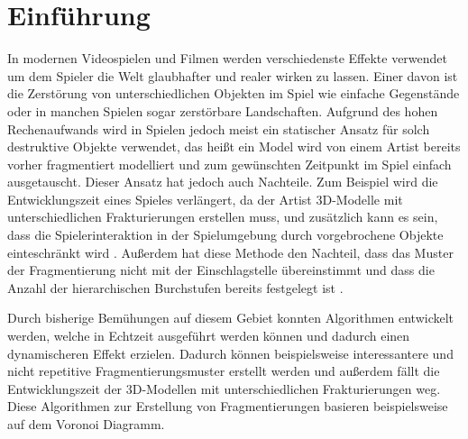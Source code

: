 \chapter{Einführung}

In modernen Videospielen und Filmen werden verschiedenste Effekte verwendet um dem Spieler die Welt glaubhafter und realer wirken zu lassen.
Einer davon ist die Zerstörung von unterschiedlichen Objekten im Spiel wie einfache Gegenstände oder in manchen Spielen sogar zerstörbare Landschaften.
Aufgrund des hohen Rechenaufwands wird in Spielen jedoch meist ein statischer Ansatz für solch destruktive Objekte verwendet, das heißt ein Model wird von einem Artist 
bereits vorher fragmentiert modelliert und zum gewünschten Zeitpunkt im Spiel einfach ausgetauscht. Dieser Ansatz hat jedoch auch Nachteile. 
Zum Beispiel wird die Entwicklungszeit eines Spieles verlängert, da der Artist 3D-Modelle mit unterschiedlichen Frakturierungen erstellen muss,
und zusätzlich kann es sein, dass die Spielerinteraktion in der Spielumgebung durch vorgebrochene Objekte einteschränkt wird \cite{Najim.DynamicFracturing}.
Außerdem hat diese Methode den Nachteil, dass das Muster der Fragmentierung nicht mit der Einschlagstelle übereinstimmt und dass die Anzahl der 
hierarchischen Burchstufen bereits festgelegt ist \cite{Mueller.RealTimeDynamicFractureVACD}.

Durch bisherige Bemühungen auf diesem Gebiet konnten Algorithmen entwickelt werden, welche in Echtzeit ausgeführt werden können und dadurch
einen dynamischeren Effekt erzielen. Dadurch können beispielsweise interessantere und nicht repetitive Fragmentierungsmuster erstellt werden und außerdem fällt die 
Entwicklungszeit der 3D-Modellen mit unterschiedlichen Frakturierungen weg.
Diese Algorithmen zur Erstellung von Fragmentierungen basieren beispielsweise auf dem Voronoi Diagramm.